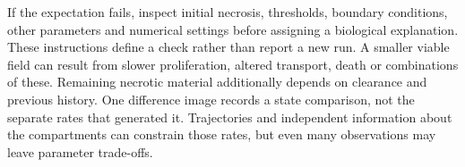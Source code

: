 If the expectation fails, inspect initial necrosis, thresholds, boundary conditions, other parameters and numerical settings before assigning a biological explanation. These instructions define a check rather than report a new run.
A smaller viable field can result from slower proliferation, altered transport, death or combinations of these. Remaining necrotic material additionally depends on clearance and previous history. One difference image records a state comparison, not the separate rates that generated it. Trajectories and independent information about the compartments can constrain those rates, but even many observations may leave parameter trade-offs.

